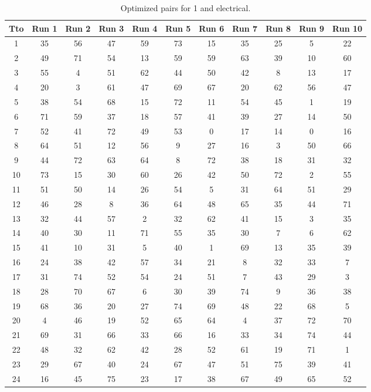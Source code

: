 \begin{table}
  \centering
  \scriptsize
  \caption{Optimized pairs for 1 and electrical.}
  \label{tab_pairs}
\begin{tabular}{c c c c c c c c c c c }
\hline
Tto & Run 1 & Run 2 & Run 3 & Run 4 & Run 5 & Run 6 & Run 7 & Run 8 & Run 9 & Run 10 \\
\hline
1 & 35 & 56 & 47 & 59 & 73 & 15 & 35 & 25 & 5 & 22 \\
2 & 49 & 71 & 54 & 13 & 59 & 59 & 63 & 39 & 10 & 60 \\
3 & 55 & 4 & 51 & 62 & 44 & 50 & 42 & 8 & 13 & 17 \\
4 & 20 & 3 & 61 & 47 & 69 & 67 & 20 & 62 & 56 & 47 \\
5 & 38 & 54 & 68 & 15 & 72 & 11 & 54 & 45 & 1 & 19 \\
6 & 71 & 59 & 37 & 18 & 57 & 41 & 39 & 27 & 14 & 50 \\
7 & 52 & 41 & 72 & 49 & 53 & 0 & 17 & 14 & 0 & 16 \\
8 & 64 & 51 & 12 & 56 & 9 & 27 & 16 & 3 & 50 & 66 \\
9 & 44 & 72 & 63 & 64 & 8 & 72 & 38 & 18 & 31 & 32 \\
10 & 73 & 15 & 30 & 60 & 26 & 42 & 50 & 72 & 2 & 55 \\
11 & 51 & 50 & 14 & 26 & 54 & 5 & 31 & 64 & 51 & 29 \\
12 & 46 & 28 & 8 & 36 & 64 & 48 & 65 & 35 & 44 & 71 \\
13 & 32 & 44 & 57 & 2 & 32 & 62 & 41 & 15 & 3 & 35 \\
14 & 40 & 30 & 11 & 71 & 55 & 35 & 30 & 7 & 6 & 62 \\
15 & 41 & 10 & 31 & 5 & 40 & 1 & 69 & 13 & 35 & 39 \\
16 & 24 & 38 & 42 & 57 & 34 & 21 & 8 & 32 & 33 & 7 \\
17 & 31 & 74 & 52 & 54 & 24 & 51 & 7 & 43 & 29 & 3 \\
18 & 28 & 70 & 67 & 6 & 30 & 39 & 74 & 9 & 36 & 38 \\
19 & 68 & 36 & 20 & 27 & 74 & 69 & 48 & 22 & 68 & 5 \\
20 & 4 & 46 & 19 & 52 & 65 & 64 & 4 & 37 & 72 & 70 \\
21 & 69 & 31 & 66 & 33 & 66 & 16 & 33 & 34 & 74 & 44 \\
22 & 48 & 32 & 62 & 42 & 28 & 52 & 61 & 19 & 71 & 1 \\
23 & 29 & 67 & 40 & 24 & 67 & 47 & 51 & 75 & 39 & 41 \\
24 & 16 & 45 & 75 & 23 & 17 & 38 & 67 & 49 & 65 & 52 \\

\end{tabular}
\end{table}
